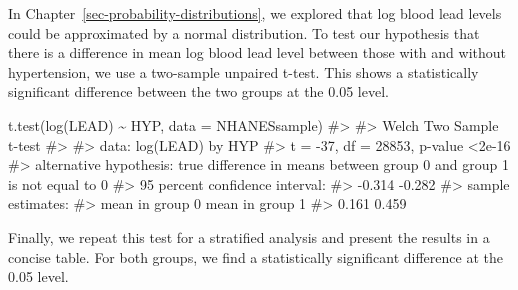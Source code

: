 \documentclass[
  letterpaper,
]{latex/krantz}
\makeatletter
\newenvironment{Shaded}{\begin{snugshade}}{\end{snugshade}}
\newcommand{\AttributeTok}[1]{\textcolor[rgb]{0.40,0.45,0.13}{#1}}
\newcommand{\CommentTok}[1]{\textcolor[rgb]{0.37,0.37,0.37}{#1}}
\newcommand{\FunctionTok}[1]{\textcolor[rgb]{0.28,0.35,0.67}{#1}}
\newcommand{\NormalTok}[1]{\textcolor[rgb]{0.00,0.23,0.31}{#1}}
\newcommand{\SpecialCharTok}[1]{\textcolor[rgb]{0.37,0.37,0.37}{#1}}
\newenvironment{kframe}{%
\medskip{}
\setlength{\fboxsep}{.8em}
 \def\at@end@of@kframe{}%
 \ifinner\ifhmode%
  \def\at@end@of@kframe{\end{minipage}}%
  \begin{minipage}{\columnwidth}%
 \fi\fi%
 \def\FrameCommand##1{\hskip\@totalleftmargin \hskip-\fboxsep
 \colorbox{shadecolor}{##1}\hskip-\fboxsep
     \hskip-\linewidth \hskip-\@totalleftmargin \hskip\columnwidth}%
 \MakeFramed {\advance\hsize-\width
   \@totalleftmargin\z@ \linewidth\hsize
   \@setminipage}}%
 {\par\unskip\endMakeFramed%
 \at@end@of@kframe}
\renewenvironment{Shaded}{\begin{kframe}}{\end{kframe}}
\makeatother
\begin{document}
In Chapter~\ref{sec-probability-distributions}, we explored that log
blood lead levels could be approximated by a normal distribution. To
test our hypothesis that there is a difference in mean log blood lead
level between those with and without hypertension, we use a two-sample
unpaired t-test. This shows a statistically significant difference
between the two groups at the 0.05 level.

\begin{Shaded}
\begin{Highlighting}[]
\FunctionTok{t.test}\NormalTok{(}\FunctionTok{log}\NormalTok{(LEAD) }\SpecialCharTok{\textasciitilde{}}\NormalTok{ HYP, }\AttributeTok{data =}\NormalTok{ NHANESsample)}
\CommentTok{\#\textgreater{} }
\CommentTok{\#\textgreater{}  Welch Two Sample t{-}test}
\CommentTok{\#\textgreater{} }
\CommentTok{\#\textgreater{} data:  log(LEAD) by HYP}
\CommentTok{\#\textgreater{} t = {-}37, df = 28853, p{-}value \textless{}2e{-}16}
\CommentTok{\#\textgreater{} alternative hypothesis: true difference in means between group 0 and group 1 is not equal to 0}
\CommentTok{\#\textgreater{} 95 percent confidence interval:}
\CommentTok{\#\textgreater{}  {-}0.314 {-}0.282}
\CommentTok{\#\textgreater{} sample estimates:}
\CommentTok{\#\textgreater{} mean in group 0 mean in group 1 }
\CommentTok{\#\textgreater{}           0.161           0.459}
\end{Highlighting}
\end{Shaded}

Finally, we repeat this test for a stratified analysis and present the
results in a concise table. For both groups, we find a statistically
significant difference at the 0.05 level.
\end{document}

